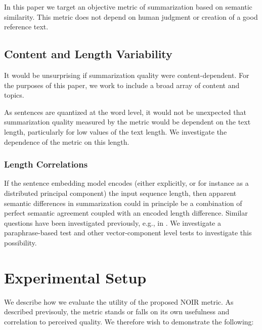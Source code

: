 \documentclass{article}
\begin{document}
In this paper we target an objective metric of summarization based on semantic similarity.
This metric does not depend on human judgment or creation of a good reference text.

\subsection{Content and Length Variability}

It would be unsurprising if summarization quality were content-dependent.  
For the purposes of this paper, we work to include a broad array of content and topics.

As sentences are quantized at the word level, it would not be unexpected that summarization quality measured by the metric would be dependent on the text length, particularly for low values of the text length.  We investigate the dependence of the metric on this length.

\subsubsection{Length Correlations}

If the sentence embedding model encodes (either explicitly, or for instance as a distributed principal component) the input sequence length, then apparent semantic differences in summarization could in principle be a combination of perfect semantic agreement coupled with an encoded length difference.  
Similar questions have been investigated previously, e.g., in \citep{finegrained}.
We investigate a paraphrase-based test and other vector-component level tests to investigate this possibility.


\section{Experimental Setup}

We describe how we evaluate the utility of the proposed NOIR metric.  
As described previsouly, the metric stands or falls on its own usefulness and correlation to perceived quality.
We therefore wish to demonstrate the following:
\end{document}
